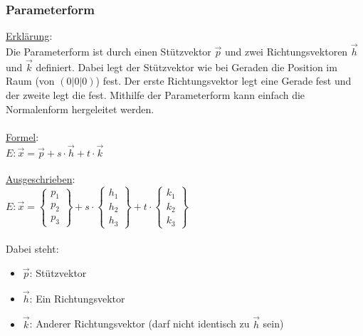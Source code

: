 
\subsubsection{Parameterform}
\underline{Erklärung}: \\
Die Parameterform ist durch einen Stützvektor $\vec{p}$ und zwei Richtungsvektoren $\vec{h}$ und $\vec{k}$ definiert. 
Dabei legt der Stützvektor wie bei Geraden die Position im Raum (von $(0|0|0)$) fest. 
Der erste Richtungsvektor legt eine Gerade fest und der zweite legt die fest.
Mithilfe der Parameterform kann einfach die Normalenform hergeleitet werden.
\\\\
\underline{Formel}: \\
$
E: \vec{x} = \vec{p} + s\cdot\vec{h} + t\cdot\vec{k}
$
\\\\
\underline{Ausgeschrieben}: \\
$
E: \vec{x} = 
\begin{Bmatrix}
    p_1 \\ p_2 \\ p_3
\end{Bmatrix}
 + s \cdot
\begin{Bmatrix}
    h_1 \\ h_2 \\ h_3
\end{Bmatrix}
 + t \cdot 
 \begin{Bmatrix}
    k_1 \\ k_2 \\ k_3
 \end{Bmatrix}
$
\\\\
Dabei steht:
\begin{itemize}
    \item $\vec{p}$: Stützvektor
    \item $\vec{h}$: Ein Richtungsvektor
    \item $\vec{k}$: Anderer Richtungsvektor (darf nicht identisch zu $\vec{h}$ sein)
\end{itemize}
